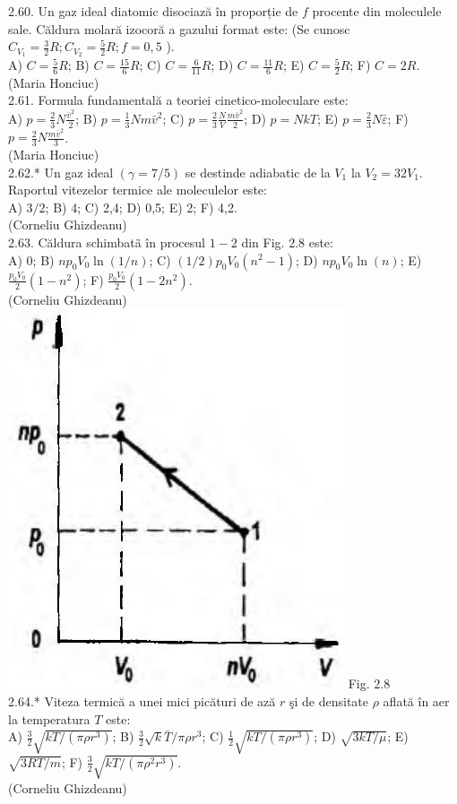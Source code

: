 2.60. Un gaz ideal diatomic disociază în proporție de $f$ procente din moleculele sale. Căldura molară izocoră a gazului format este: (Se cunosc $C_{V_{1}}=\frac{3}{2} R ; C_{V_{2}}=\frac{5}{2} R ; f=0,5$ ).\\ A) $C=\frac{5}{6} R$; B) $C=\frac{15}{6} R$; C) $C=\frac{6}{11} R$; D) $C=\frac{11}{6} R$; E) $C=\frac{5}{2} R$; F) $C=2 R$.\\ (Maria Honciuc)\\

2.61. Formula fundamentală a teoriei cinetico-moleculare este:\\ A) $p=\frac{2}{3} N \frac{\bar{v}^{2}}{2}$; B) $p=\frac{1}{3} N m \bar{v}^{2}$; C) $p=\frac{2}{3} \frac{N}{V} \frac{m \bar{v}^{2}}{2}$; D) $p=N k T$; E) $p=\frac{2}{3} N \bar{\varepsilon}$; F) $p=\frac{2}{3} N \frac{m \bar{v}^{2}}{3}$.\\ (Maria Honciuc)\\

2.62.* Un gaz ideal $(\gamma=7 / 5)$ se destinde adiabatic de la $V_{1}$ la $V_{2}=32 V_{1}$. Raportul vitezelor termice ale moleculelor este:\\ A) $3 / 2$; B) 4; C) 2,4; D) 0,5; E) 2; F) 4,2.\\ (Corneliu Ghizdeanu)\\

2.63. Căldura schimbatã în procesul $1-2$ din Fig. 2.8 este:\\ A) $0$; B) $n p_{0} V_{0} \ln (1 / n)$; C) $(1 / 2) p_{0} V_{0}\left(n^{2}-1\right)$; D) $n p_{0} V_{0} \ln (n)$; E) $\frac{p_{0} V_{0}}{2}\left(1-n^{2}\right)$; F) $\frac{p_{0} V_{0}}{2}\left(1-2 n^{2}\right)$.\\ (Corneliu Ghizdeanu)\\ \includegraphics[width=0.4\linewidth]{images/2025_07_01_5b3ff9fa0d508c8e9f17g-087} Fig. 2.8\\

2.64.* Viteza termică a unei mici picături de ază $r$ şi de densitate $\rho$ aflată în aer la temperatura $T$ este:\\ A) $\frac{3}{2} \sqrt{k T /\left(\pi \rho r^{3}\right)}$; B) $\frac{3}{2} \sqrt{k} \bar{T} / \pi \rho r^{3}$; C) $\frac{1}{2} \sqrt{k T /\left(\pi \rho r^{3}\right)}$; D) $\sqrt{3 k T / \mu}$; E) $\sqrt{3 R T / m}$; F) $\frac{3}{2} \sqrt{k T /\left(\pi \rho^{2} r^{3}\right)}$.\\ (Corneliu Ghizdeanu)\\

